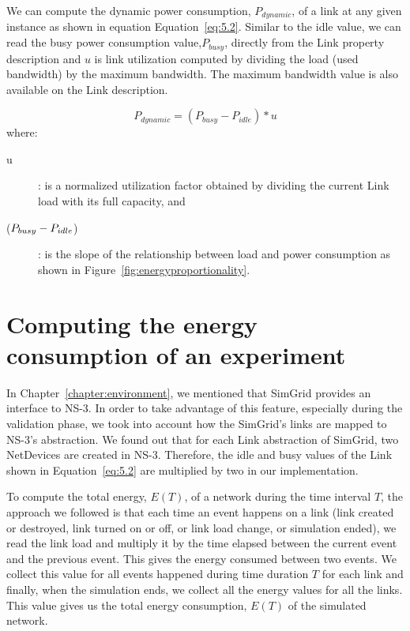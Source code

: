 We can compute the dynamic power consumption, \(P_{dynamic}\), of a link at any given instance as shown in equation Equation~\ref{eq:5.2}. Similar to the idle value, we can read the busy power consumption value,\(P_{busy}\), directly from the 
Link property description and $u$ is link utilization computed by dividing the load (used bandwidth) by the maximum bandwidth. The maximum bandwidth value is also available on the Link description. 

\begin{equation} \label{eq:5.2}
P_{dynamic} = (P_{busy} - P_{idle}) * u 
\end{equation} 
where:
\begin{description}
    \item [u]: is a normalized utilization factor obtained by dividing the current Link load with its full capacity, and 
    \item [(\($$P_{busy} - P_{idle}$$\))]: is the slope of the relationship between load and power consumption as shown in Figure~\ref{fig:energyproportionality}.
\end{description} 

\section{Computing the energy consumption of an experiment}
In Chapter~\ref{chapter:environment}, we mentioned that SimGrid provides an interface to NS-3. In order to take advantage of this feature, especially during the validation phase, we took into account how the SimGrid's links are mapped to NS-3's abstraction. We found out that for each Link abstraction of SimGrid, two NetDevices are created in NS-3. Therefore, the idle and busy values of the Link shown in Equation~\ref{eq:5.2} are multiplied by two in our implementation.

To compute the total energy, \(E(T)\), of a network during the time interval $T$, the approach we followed is that each time an event happens on a link (link created or destroyed, link turned on or off, or link load change, or simulation ended), we read the link load and multiply it by the time elapsed between the current event and the previous event. This gives the energy consumed between two events. We collect this value for all events happened during time duration $T$ for each link and finally, when the simulation ends, we collect all the energy values for all the links. This value gives us the total energy consumption, \(E(T)\) of the simulated network.

